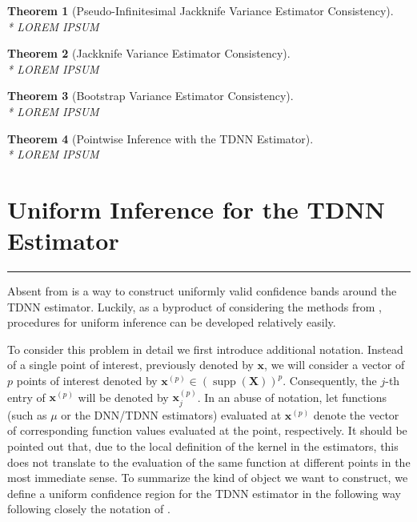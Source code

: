 \documentclass[letterpaper,10pt]{article}
\numberwithin{equation}{section}
\newtheorem{thm}{Theorem}
\numberwithin{thm}{section}
\numberwithin{lem}{section}
\numberwithin{cor}{section}
\renewcommand{\hat}{\widehat}
\newcommand{\1}{\mathbb{1}}
\begin{document}
	{\color{red}
		\begin{thm}[Pseudo-Infinitesimal Jackknife Variance Estimator Consistency]\label{PI_JK_Cons}\mbox{}\\*
			LOREM IPSUM
		\end{thm}

		\begin{thm}[Jackknife Variance Estimator Consistency]\label{JK_Cons}\mbox{}\\*
			LOREM IPSUM
		\end{thm}

		\begin{thm}[Bootstrap Variance Estimator Consistency]\label{BS_Cons}\mbox{}\\*
			LOREM IPSUM
		\end{thm}

		\begin{thm}[Pointwise Inference with the TDNN Estimator]\label{PW_Inf_TDNN}\mbox{}\\*
			LOREM IPSUM
		\end{thm}
	}

\newpage
\section{Uniform Inference for the TDNN Estimator}\label{UnifInf}
\hrule
Absent from \citet{demirkaya_optimal_2024} is a way to construct uniformly valid confidence bands around the TDNN estimator.
Luckily, as a byproduct of considering the methods from \citet{ritzwoller_uniform_2024}, procedures for uniform inference can be developed relatively easily.

To consider this problem in detail we first introduce additional notation.
Instead of a single point of interest, previously denoted by $\mathbf{x}$, we will consider a vector of $p$ points of interest denoted by $\mathbf{x}^{(p)} \in \left(\operatorname{supp}\left(\mathbf{X}\right)\right)^{p}$.
Consequently, the $j$-th entry of $\mathbf{x}^{(p)}$ will be denoted by $\mathbf{x}^{(p)}_{j}$.
In an abuse of notation, let functions (such as $\mu$ or the DNN/TDNN estimators) evaluated at $\mathbf{x}^{(p)}$ denote the vector of corresponding function values evaluated at the point, respectively.
It should be pointed out that, due to the local definition of the kernel in the estimators, this does not translate to the evaluation of the same function at different points in the most immediate sense.
To summarize the kind of object we want to construct, we define a uniform confidence region for the TDNN estimator in the following way following closely the notation of \citet{ritzwoller_uniform_2024}.
\end{document}
